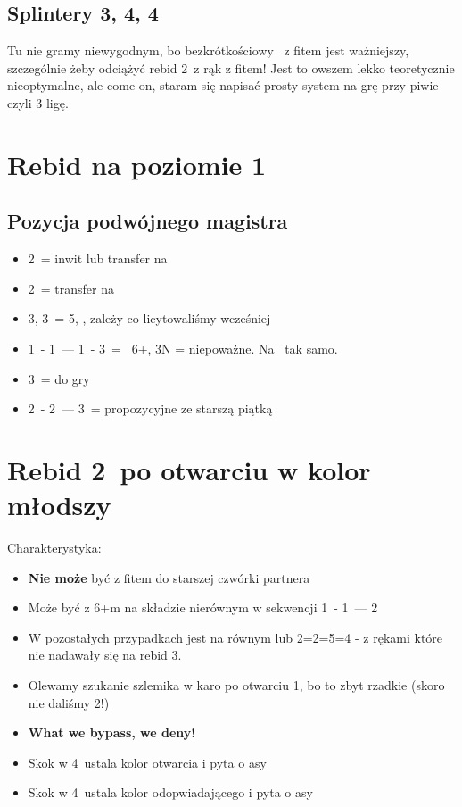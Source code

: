 \documentclass[12pt, a4paper]{article}
\begin{document}
\subsection*{Splintery 3\spades, 4\clubs, 4\diams}
Tu nie gramy niewygodnym, bo bezkrótkościowy \gf\ z fitem jest ważniejszy, szczególnie żeby odciążyć rebid 2\nt\ z rąk z fitem!
Jest to owszem lekko teoretycznie nieoptymalne, ale come on, staram się napisać prosty system na grę przy piwie czyli 3 ligę.



\pagebreak
\section{Rebid na poziomie 1}
\subsection*{Pozycja podwójnego magistra}
\begin{itemize}
    \item 2\clubs\ = inwit lub transfer na \diams\
    \item 2\nt\ = transfer na \clubs\
    \item 3\clubs, 3\diams\ = 5\major, \gf, zależy co licytowaliśmy wcześniej
    \item 1\clubs\ - 1\spades\ --- 1\nt\ - 3\spades\ = \gf\ 6+\spades, 3N = niepoważne. Na \hearts\ tak samo.
    \item 3\nt\ = do gry
    \item 2\clubs\ - 2\diams\ --- 3\nt\ = propozycyjne ze starszą piątką
\end{itemize}



\pagebreak
\section{Rebid 2\ntx\ po otwarciu w kolor młodszy}
Charakterystyka:
\begin{itemize}
    \item \textbf{Nie może} być z fitem do starszej czwórki partnera
    \item Może być z 6+m na składzie nierównym w sekwencji 1\diams\ - 1\hearts\ --- 2\nt
    \item W pozostałych przypadkach jest na równym lub 2=2=5=4 - z rękami które nie nadawały się na rebid 3\clubs.
    \item Olewamy szukanie szlemika w karo po otwarciu 1\clubs, bo to zbyt rzadkie (skoro nie daliśmy 2\diams!)
    \item \textbf{What we bypass, we deny!}
    \item Skok w 4\clubs\ ustala kolor otwarcia i pyta o asy
    \item Skok w 4\diams\ ustala kolor odopwiadającego i pyta o asy
\end{itemize}
\end{document}
